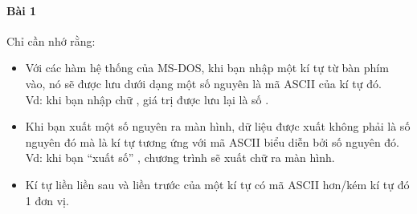 \documentclass[main.tex]{subfiles}
\begin{document}
\paragraph*{Bài 1}
Chỉ cần nhớ rằng:
\begin{itemize}
    \item Với các hàm hệ thống của MS-DOS, khi bạn nhập một kí tự từ bàn phím vào, nó sẽ được lưu dưới dạng một số nguyên là mã ASCII của kí tự đó.\\
        Vd: khi bạn nhập chữ , giá trị được lưu lại là số .
    \item Khi bạn xuất một số nguyên ra màn hình, dữ liệu được xuất không phải là số nguyên đó mà là kí tự tương ứng với mã ASCII biểu diễn bởi số nguyên đó.\\
        Vd: khi bạn ``xuất số'' , chương trình sẽ xuất chữ  ra màn hình.
    \item Kí tự liền liền sau và liền trước của một kí tự có mã ASCII hơn/kém kí tự đó 1 đơn vị.
\end{itemize}

\inputminted[linenos,breaklines]{nasm}{answer_source/Bai1.asm}
\end{document}
